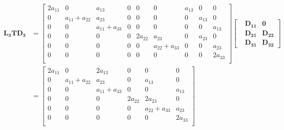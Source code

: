 \documentclass{article}
\begin{document}
\begin{equation}
\begin{aligned}
\mathbf{L_3}\mathbf{T} \mathbf{D_3} &=
\begin{bmatrix}
2a_{11} &0 &a_{13} &0 &0 &0 &a_{13} &0 &0\\
0 &a_{11}+a_{22} &a_{23} &0 &0 &0 &0 &a_{13} &0\\
0 &0 &a_{11}+a_{33} &0 &0 &0 &0 &0 &a_{13}\\
0 &0 &0 &0 &2a_{22} &a_{23} &0 &a_{23} &0\\
0 &0 &0 &0 &0 &a_{22}+a_{33} &0 &0 &a_{23}\\
0 &0 &0 &0 &0 &0 &0 &0 &2a_{33}\\
\end{bmatrix}
\begin{bmatrix}
&\mathbf{D_{11}} &\mathbf{0}  \\
&\mathbf{D_{21}} &\mathbf{D_{22}}  \\
&\mathbf{D_{31}} &\mathbf{D_{32}} 
\end{bmatrix} \\
&=
\begin{bmatrix}
2a_{11} &0 &2a_{13} &0 &0 &0 \\
0 &a_{11}+a_{22} &a_{23} &0 &a_{13} &0 \\
0 &0 &a_{11}+a_{33} &0 &0 &a_{13} \\
0 &0 &0 &2a_{22} &2 a_{23} &0 \\
0 &0 &0 &0 &a_{22}+a_{33} &a_{23} \\
0 &0 &0 &0 &0 &2a_{33} \\
\end{bmatrix}
\end{aligned}
\end{equation}
\end{document}
